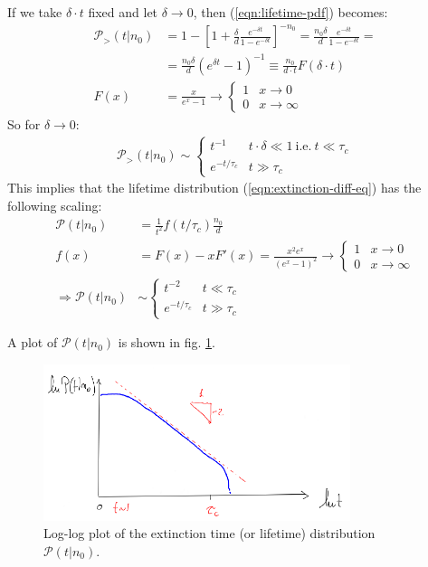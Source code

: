 \documentclass[../../main.tex]{subfiles}
\begin{document}
\medskip

If we take $\delta \cdot t$ fixed and let $\delta \to 0$, then (\ref{eqn:lifetime-pdf}) becomes:
\begin{align*}
    \mathcal{P}_>(t|n_0) &= 1-\left[1+\frac{\delta}{d} \frac{e^{-\delta t}}{1 - e^{-\delta t}}  \right]^{-n_0} = \frac{n_0 \delta}{d} \frac{e^{-\delta t}}{1 - e^{-\delta t}} =\\
    &= \frac{n_0 \delta}{d} (e^{\delta t} - 1)^{-1} \equiv \frac{n_0}{d \cdot t} F(\delta \cdot t)  \\
    F(x) &= \frac{x}{e^x -1} \to \begin{cases}
        1 & x \to 0\\
        0 & x \to \infty
    \end{cases}
\end{align*}
So for $\delta \to 0$:
\begin{align*}
    \mathcal{P}_>(t|n_0) \sim \begin{cases}
        t^{-1} & t \cdot \delta \ll 1 \mathrm{\ i.e.\ } t \ll \tau_c\\
        e^{-t/\tau_c} & t \gg \tau_c
    \end{cases}
\end{align*}
This implies that the lifetime distribution (\ref{eqn:extinction-diff-eq}) has the following scaling:
\begin{align}\label{eqn:lifetime-dist}
    \mathcal{P}(t|n_0) &= \frac{1}{t^2} f(t/\tau_c) \frac{n_0}{d}\\ \nonumber
    f(x) &= F(x) - xF'(x) = \frac{x^2 e^x}{(e^x - 1)^2} \to \begin{cases}
        1 & x \to 0\\
        0 & x \to \infty
    \end{cases} \\ \nonumber
    \Rightarrow \mathcal{P}(t|n_0) &\sim \begin{cases}
        t^{-2} & t \ll \tau_c\\
        e^{-t/\tau_c} & t \gg \tau_c
    \end{cases}
\end{align}

A plot of $\mathcal{P}(t|n_0)$ is shown in fig. \ref{fig:lifetime-dist}.

\begin{figure}[H]
    \centering
    \includegraphics[width=0.8\textwidth]{lifetime-dist.png}
    \caption{Log-log plot of the extinction time (or lifetime) distribution $\mathcal{P}(t|n_0)$.}
    \label{fig:lifetime-dist}
\end{figure}
\end{document}
